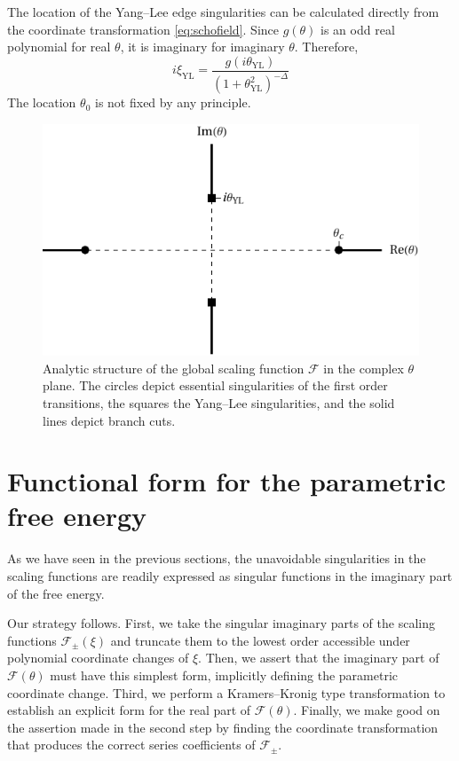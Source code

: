\documentclass[
aps,
pre,
preprint,
longbibliography,
floatfix
]{revtex4-2}
\begin{document}
The location of the Yang--Lee edge singularities can be calculated directly
from the coordinate transformation \eqref{eq:schofield}. Since $g(\theta)$ is
an odd real polynomial for real $\theta$, it is imaginary for imaginary
$\theta$. Therefore,
\begin{equation} \label{eq:yang-lee.theta}
  i\xi_{\mathrm{YL}}=\frac{g(i\theta_{\mathrm{YL}})}{(1+\theta_{\mathrm{YL}}^2)^{-\Delta}}
\end{equation}
The location $\theta_0$ is not fixed by any principle.

\begin{figure}
  \includegraphics{figs/F_theta_singularities.pdf}
  \caption{
    Analytic structure of the global scaling function $\mathcal F$ in the
    complex $\theta$ plane. The circles depict essential singularities of the
    first order transitions, the squares the Yang--Lee singularities, and the
    solid lines depict branch cuts.
  } \label{fig:schofield.singularities}
\end{figure}

\section{Functional form for the parametric free energy}

As we have seen in the previous sections, the unavoidable singularities in the
scaling functions are readily expressed as singular functions in the imaginary
part of the free energy.

Our strategy follows. First, we take the singular imaginary parts of the
scaling functions $\mathcal F_{\pm}(\xi)$ and truncate them to the lowest order
accessible under polynomial coordinate changes of $\xi$. Then, we assert that
the imaginary part of $\mathcal F(\theta)$ must have this simplest form,
implicitly defining the parametric coordinate change. Third, we perform a
Kramers--Kronig type transformation to establish an explicit form for the real
part of $\mathcal F(\theta)$. Finally, we make good on the assertion made in
the second step by finding the coordinate transformation that produces the
correct series coefficients of $\mathcal F_{\pm}$.
\end{document}
